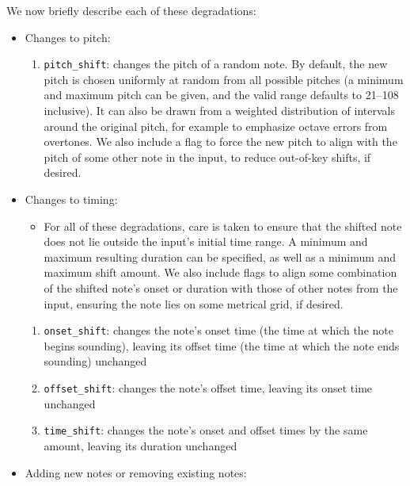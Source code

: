 \documentclass[12pt,a4paper,]{report}
\providecommand{\tightlist}{%
  \setlength{\itemsep}{0pt}\setlength{\parskip}{0pt}}
\begin{document}
We now briefly describe each of these degradations:

\begin{itemize}
\tightlist
\item
  Changes to pitch:

  \begin{enumerate}
  \def\labelenumi{\arabic{enumi}.}
  \tightlist
  \item
    \texttt{pitch\_shift}: changes the pitch of a random note. By
    default, the new pitch is chosen uniformly at random from all
    possible pitches (a minimum and maximum pitch can be given, and the
    valid range defaults to 21--108 inclusive). It can also be drawn
    from a weighted distribution of intervals around the original pitch,
    for example to emphasize octave errors from overtones. We also
    include a flag to force the new pitch to align with the pitch of
    some other note in the input, to reduce out-of-key shifts, if
    desired.
  \end{enumerate}
\item
  Changes to timing:

  \begin{itemize}
  \tightlist
  \item
    For all of these degradations, care is taken to ensure that the
    shifted note does not lie outside the input's initial time range. A
    minimum and maximum resulting duration can be specified, as well as
    a minimum and maximum shift amount. We also include flags to align
    some combination of the shifted note's onset or duration with those
    of other notes from the input, ensuring the note lies on some
    metrical grid, if desired.
  \end{itemize}

  \begin{enumerate}
  \def\labelenumi{\arabic{enumi}.}
  \setcounter{enumi}{1}
  \tightlist
  \item
    \texttt{onset\_shift}: changes the note's onset time (the time at
    which the note begins sounding), leaving its offset time (the time
    at which the note ends sounding) unchanged
  \item
    \texttt{offset\_shift}: changes the note's offset time, leaving its
    onset time unchanged
  \item
    \texttt{time\_shift}: changes the note's onset and offset times by
    the same amount, leaving its duration unchanged
  \end{enumerate}
\item
  Adding new notes or removing existing notes:


\end{itemize}
\end{document}
